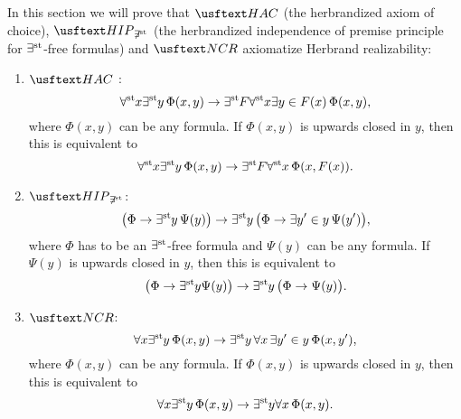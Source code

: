 In this section we will prove that $\HAC$ (the herbrandized axiom of choice), $\HIP_{\not\exists^{\st}}$ (the herbrandized independence of premise principle for $\exists^{\operatorname{st}}$-free formulas) and $\NCR$ axiomatize Herbrand realizability:
\begin{enumerate}
\item $\HAC$ : \[
     \forall^{\operatorname{st}{}}\! x \exists^{\operatorname{st}{}}\! y \, \Phi(x,y) \to \exists^{\operatorname{st}{}}\! F \forall^{\operatorname{st}{}}\! x \exists y \in F(x) \,  \Phi (x,y),
            \]
            where $\Phi(x,y)$ can be any formula.
           If $\Phi(x,y)$ is upwards closed in $y$, then this is equivalent to
           \[
               \forall^{\operatorname{st}{}}\! x \exists^{\operatorname{st}{}}\! y  \, \Phi(x,y) \to \exists^{\operatorname{st}{}}\! F \forall^{\operatorname{st}{}}\! x \, \Phi (x,F(x)).
            \]
\item $\HIP_{\not\exists^{\st}}$: \[
    \big( \Phi \to\exists^{\operatorname{st}{}}\! y \, \Psi(y)\big)\rightarrow \exists^{\operatorname{st}{}}\! y \, \big( \Phi \to \exists y' \in y \, \Psi(y')\big),
            \]
            where $\Phi$ has to be an $\exists^{\operatorname{st}{}}\!$-free formula and $\Psi(y)$ can be any formula.
           If $\Psi(y)$ is upwards closed in $y$, then this is equivalent to
           \[
        \big( \Phi \to\exists^{\operatorname{st}{}}\! y\Psi(y)\big)\rightarrow \exists^{\operatorname{st}{}}\! y \, \big(\Phi \to \Psi(y)\big).  
            \]
\item $\NCR$: \[
                \forall x \exists^{\operatorname{st}{}}\! y \,  \Phi (x,y) \to \exists^{\operatorname{st}{}}\! y \, \forall x \, \exists y' \in y \, \Phi(x,y') ,
            \]
            where $\Phi(x, y)$ can be any formula.
           If $\Phi(x,y)$ is upwards closed in $y$, then this is equivalent to
           \[
               \forall x \exists^{\operatorname{st}{}}\! y \, \Phi (x,y) \to \exists^{\operatorname{st}{}}\! y \forall x  \, \Phi(x,y) .
            \]
\end{enumerate}

